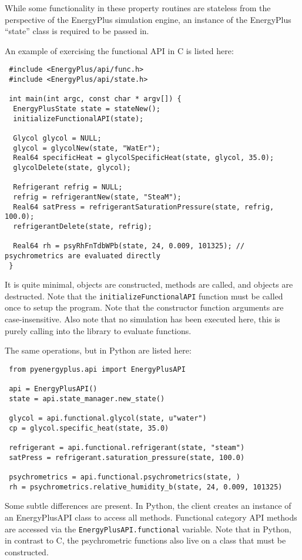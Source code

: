 While some functionality in these property routines are stateless from the perspective of the EnergyPlus simulation engine, an instance of the EnergyPlus ``state'' class is required to be passed in.

An example of exercising the functional API in C is listed here:

\begin{lstlisting}
 #include <EnergyPlus/api/func.h>
 #include <EnergyPlus/api/state.h>

 int main(int argc, const char * argv[]) {
  EnergyPlusState state = stateNew();
  initializeFunctionalAPI(state);

  Glycol glycol = NULL;
  glycol = glycolNew(state, "WatEr");
  Real64 specificHeat = glycolSpecificHeat(state, glycol, 35.0);
  glycolDelete(state, glycol);

  Refrigerant refrig = NULL;
  refrig = refrigerantNew(state, "SteaM");
  Real64 satPress = refrigerantSaturationPressure(state, refrig, 100.0);
  refrigerantDelete(state, refrig);

  Real64 rh = psyRhFnTdbWPb(state, 24, 0.009, 101325); // psychrometrics are evaluated directly
 }
\end{lstlisting}

It is quite minimal, objects are constructed, methods are called, and objects are destructed.
Note that the \verb=initializeFunctionalAPI= function must be called once to setup the program.
Note that the constructor function arguments are case-insensitive.
Also note that no simulation has been executed here, this is purely calling into the library to evaluate functions.

The same operations, but in Python are listed here:

\begin{lstlisting}
 from pyenergyplus.api import EnergyPlusAPI

 api = EnergyPlusAPI()
 state = api.state_manager.new_state()

 glycol = api.functional.glycol(state, u"water")
 cp = glycol.specific_heat(state, 35.0)

 refrigerant = api.functional.refrigerant(state, "steam")
 satPress = refrigerant.saturation_pressure(state, 100.0)

 psychrometrics = api.functional.psychrometrics(state, )
 rh = psychrometrics.relative_humidity_b(state, 24, 0.009, 101325)
\end{lstlisting}

Some subtle differences are present.
In Python, the client creates an instance of an EnergyPlusAPI class to access all methods.
Functional category API methods are accessed via the \verb=EnergyPlusAPI.functional= variable.
Note that in Python, in contrast to C, the psychrometric functions also live on a class that must be constructed.

